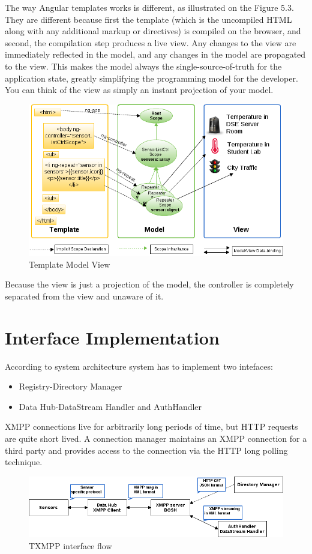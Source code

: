 	The way Angular templates works is different, as illustrated on the Figure 5.3. They are different because first the template (which is the uncompiled HTML along with any additional markup or directives) is compiled on the browser, and second, the compilation step produces a live view. Any changes to the view are immediately reflected in the model, and any changes in the model are propagated to the view. This makes the model always the single-source-of-truth for the application state, greatly simplifying the programming model for the developer. You can think of the view as simply an instant projection of your model.
	    \begin{figure}[!ht]
		\centering
		\includegraphics[scale=0.6]{images/3wayBinding.png}   
		\caption[Template Model View]{Template Model View}
		\label{img:interfaces}                           
		\end{figure}
        
    Because the view is just a projection of the model, the controller is completely separated from the view and unaware of it. 

\section{Interface Implementation}
	 According to system architecture system has to implement two intefaces:
	 \begin{itemize}
	 \item Registry-Directory Manager
	 \item Data Hub-DataStream Handler and AuthHandler
	 \end{itemize}
	 XMPP connections live for arbitrarily long periods of time, but HTTP requests are quite short lived.
	A connection manager maintains an XMPP connection for a third party and provides access to the connection via the HTTP long polling technique.
	    \begin{figure}[!ht]
		\centering
		\includegraphics[scale=0.6]{images/XMPPflow.png}   
		\caption[XMPP BOSH/Stream]{TXMPP interface flow}
		\label{img:interfaces}                           
		\end{figure}

